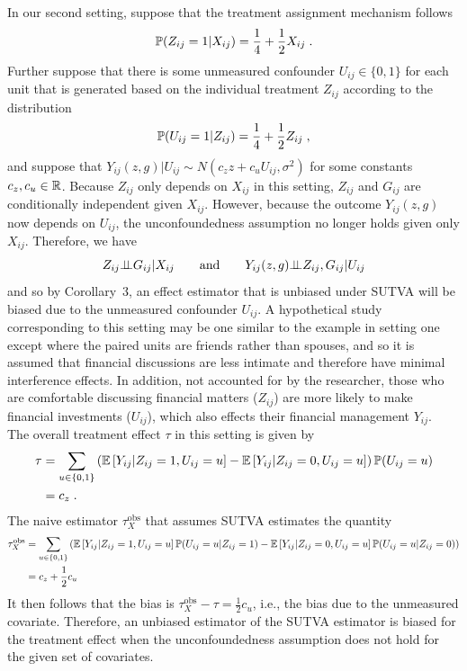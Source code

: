 \documentclass[10pt]{article}
\begin{document}
In our second setting, suppose that the treatment assignment mechanism follows
\[
\P(Z_{ij}=1|X_{ij}) = \frac{1}{4} + \frac{1}{2}X_{ij} \;.
\]
Further suppose that there is some unmeasured confounder $U_{ij}\in\{0,1\}$ for each unit that is generated based on the individual treatment $Z_{ij}$ according to the distribution
\[
\P(U_{ij}=1|Z_{ij}) = \frac{1}{4} + \frac{1}{2}Z_{ij}\;,
\]
and suppose that $Y_{ij}(z,g)|U_{ij}\sim N(c_zz+c_uU_{ij},\sigma^2)$ for some constants $c_z,c_u\in\bbR$. Because $Z_{ij}$ only depends on $X_{ij}$ in this setting, $Z_{ij}$ and $G_{ij}$ are conditionally independent given $X_{ij}$. However, because the outcome $Y_{ij}(z,g)$ now depends on $U_{ij}$, the unconfoundedness assumption no longer holds given only $X_{ij}$. Therefore, we have
\[
Z_{ij}\condind G_{ij}|X_{ij} \qquad \text{and} \qquad Y_{ij}(z,g)\condind Z_{ij},G_{ij}|U_{ij}
\]
and so by Corollary~3, an effect estimator that is unbiased under SUTVA will be biased due to the unmeasured confounder $U_{ij}$. A hypothetical study corresponding to this setting may be one similar to the example in setting one except where the paired units are friends rather than spouses, and so it is assumed that financial discussions are less intimate and therefore have minimal interference effects. In addition, not accounted for by the researcher, those who are comfortable discussing financial matters ($Z_{ij}$) are more likely to make financial investments ($U_{ij}$), which also effects their financial management $Y_{ij}$.
\\

The overall treatment effect $\tau$ in this setting is given by
\begin{align*}
\tau &= \sum_{u\in\{0,1\}}\left(\E\left[Y_{ij}|Z_{ij}=1,U_{ij}=u\right] - \E\left[Y_{ij}|Z_{ij}=0,U_{ij}=u\right]\right)\P(U_{ij}=u) \\
&= c_z \;.
\end{align*}
The naive estimator $\tau_{X}^\text{obs}$ that assumes SUTVA estimates the quantity
\begin{align*}
\tau_{X}^\text{obs} &= \sum_{u\in\{0,1\}}\left(\E\left[Y_{ij}|Z_{ij}=1,U_{ij}=u\right]\P(U_{ij}=u|Z_{ij}=1) - \E\left[Y_{ij}|Z_{ij}=0,U_{ij}=u\right]\P(U_{ij}=u|Z_{ij}=0)\right) \\
&= c_z + \frac{1}{2}c_u
\end{align*}
It then follows that the bias is $\tau_{X}^\text{obs} - \tau = \frac{1}{2}c_u$, i.e., the bias due to the unmeasured covariate. Therefore, an unbiased estimator of the SUTVA estimator is biased for the treatment effect when the unconfoundedness assumption does not hold for the given set of covariates.
\\
\end{document}
